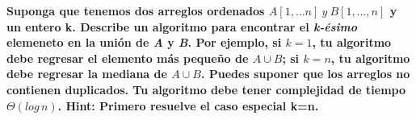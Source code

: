 \textbf{Suponga que tenemos dos arreglos ordenados $A[1,\dots n]
\ y \ B[1, \dots, n]$ y un entero k. Describe un algoritmo para 
encontrar el \textit{k-ésimo} elemeneto en la unión de  \textit{A}
y \textit{B}. Por ejemplo, si $k=1$, tu algoritmo debe regresar el
elemento más pequeño de $A \cup B$; si $k=n$, tu algoritmo debe 
regresar la mediana de $A \cup B$. Puedes suponer que los arreglos 
no contienen duplicados. Tu algoritmo debe tener complejidad de tiempo
$\Theta (log \, n)$. Hint: Primero resuelve el caso especial k=n.}